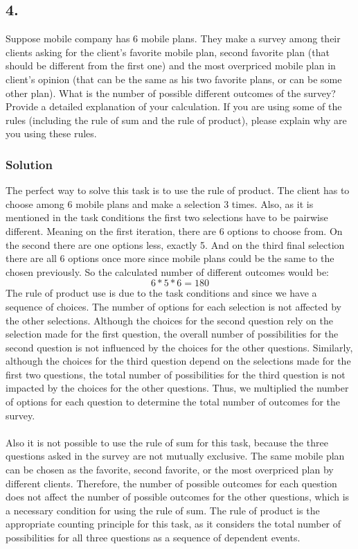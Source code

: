 \documentclass[a4paper]{article}
\begin{document}
\subsection*{4.}
Suppose mobile company has 6 mobile plans. They make a survey among their clients asking for the client’s favorite mobile plan, second favorite plan (that should be different from the first one) and the most overpriced mobile plan in client’s opinion (that can be the same as his two favorite plans, or can be some other plan). What is the number of possible different outcomes of the survey? Provide a detailed explanation of your calculation. If you are using some of the rules (including the rule of sum and the rule of product), please explain why are you using these rules.

\subsubsection*{Solution}
The perfect way to solve this task is to use the rule of product. The client has to choose among 6 mobile plans and make a selection 3 times. Also, as it is mentioned in the task сonditions the first two selections have to be pairwise different. Meaning on the first iteration, there are 6 options to choose from. On the second there are one options less, exactly 5. And on the third final selection there are all 6 options once more since mobile plans could be the same to the chosen previously. So the calculated number of different outcomes would be:
\[6 * 5 * 6 = 180\]
The rule of product use is due to the task conditions and since we have a sequence of choices. The number of options for each selection is not affected by the other selections. Although the choices for the second question rely on the selection made for the first question, the overall number of possibilities for the second question is not influenced by the choices for the other questions. Similarly, although the choices for the third question depend on the selections made for the first two questions, the total number of possibilities for the third question is not impacted by the choices for the other questions. Thus, we multiplied the number of options for each question to determine the total number of outcomes for the survey. \\ \\ 
Also it is not possible to use the rule of sum for this task, because the three questions asked in the survey are not mutually exclusive. The same mobile plan can be chosen as the favorite, second favorite, or the most overpriced plan by different clients. Therefore, the number of possible outcomes for each question does not affect the number of possible outcomes for the other questions, which is a necessary condition for using the rule of sum. The rule of product is the appropriate counting principle for this task, as it considers the total number of possibilities for all three questions as a sequence of dependent events.
\end{document}

